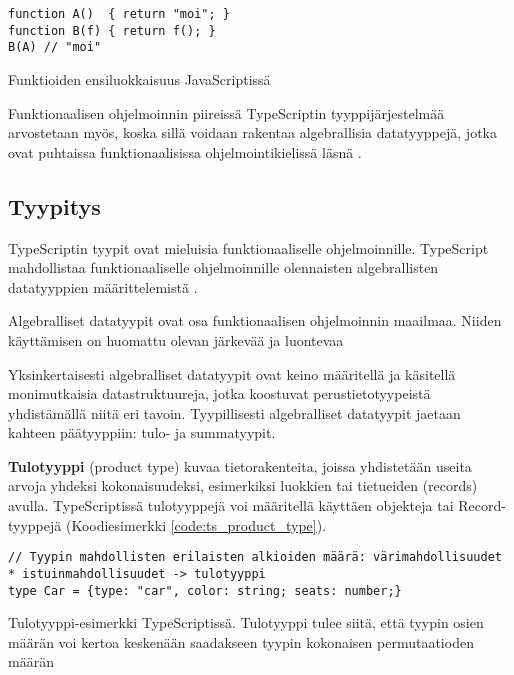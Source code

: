 \begin{code}
    \begin{verbatim}
function A()  { return "moi"; }
function B(f) { return f(); }
B(A) // "moi"
\end{verbatim}
    \caption{Funktioiden ensiluokkaisuus JavaScriptissä}
    \label{code:js_first_class}
\end{code}

Funktionaalisen ohjelmoinnin piireissä TypeScriptin tyyppijärjestelmää arvostetaan myös, koska sillä voidaan rakentaa algebrallisia datatyyppejä, jotka ovat puhtaissa funktionaalisissa ohjelmointikielissä läsnä \cite{holvikari2021category}.


\subsection{Tyypitys}

TypeScriptin tyypit ovat mieluisia funktionaaliselle ohjelmoinnille. TypeScript mahdollistaa funktionaaliselle ohjelmoinnille olennaisten algebrallisten datatyyppien määrittelemistä \cite{holvikari2021category}.

Algebralliset datatyypit ovat osa funktionaalisen ohjelmoinnin maailmaa. Niiden käyttämisen on huomattu olevan järkevää ja luontevaa \cite{holvikari2021category,hickey_maybe_not,algebraic_data_types}

Yksinkertaisesti algebralliset datatyypit ovat keino määritellä ja käsitellä monimutkaisia datastruktuureja, jotka koostuvat perustietotyypeistä yhdistämällä niitä eri tavoin. Tyypillisesti algebralliset datatyypit jaetaan kahteen päätyyppiin: tulo- ja summatyypit.

\textbf{Tulotyyppi} (product type) kuvaa tietorakenteita, joissa yhdistetään useita arvoja yhdeksi kokonaisuudeksi, esimerkiksi luokkien tai tietueiden (records) avulla.
TypeScriptissä tulotyyppejä voi määritellä käyttäen objekteja tai Record-tyyppejä (Koodiesimerkki \ref{code:ts_product_type}). \citep{algebraic_data_types,holvikari2021category}

\begin{code}
    \begin{verbatim}
// Tyypin mahdollisten erilaisten alkioiden määrä: värimahdollisuudet * istuinmahdollisuudet -> tulotyyppi
type Car = {type: "car", color: string; seats: number;}
\end{verbatim}
    \caption{Tulotyyppi-esimerkki TypeScriptissä. Tulotyyppi tulee siitä, että tyypin osien määrän voi kertoa keskenään saadakseen tyypin kokonaisen permutaatioden määrän}
    \label{code:ts_product_type}
\end{code}

